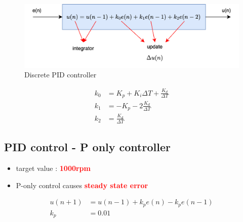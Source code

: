 \documentclass[12pt,twoside,onecolumn,openany,extrafontsizes,dvipsnames]{memoir}
\begin{document}
            \begin{figure}[!htb]
                \centering
                \includegraphics[scale=0.8]{../diagrams/control_generic/control_generic-pid_discrete.png}
                \caption{Discrete PID controller }
                \label{fig:discrete_pid_controller}
            \end{figure}

            
            \begin{align}
                k_0 &= K_p + K_i\Delta T + \frac{K_d}{\Delta T} \\
                k_1 &= -K_p - 2\frac{K_d}{\Delta T} \\
                k_2 &= \frac{K_d}{\Delta T}
            \end{align}

                \newpage
                \subsection{PID control - P only controller}

                    \begin{itemize}
                        \item  target value : \textcolor{red}{\textbf { 1000rpm}}
                        \item  P-only control causes \textcolor{red}{\textbf {steady state error}}
                    \end{itemize}
                
                    \begin{align}
                        u(n+1) &= u(n-1) + k_pe(n) - k_pe(n-1) \\
                        k_p    &= 0.01
                    \end{align}
\end{document}
